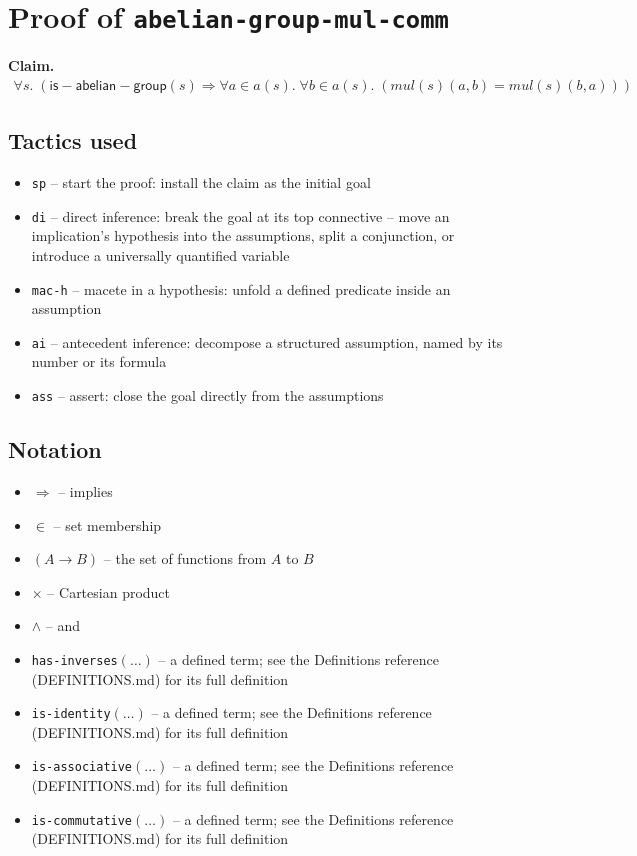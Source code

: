 \documentclass[11pt]{article}
\begin{document}
\section*{Proof of \texttt{abelian-group-mul-comm}}
\textbf{Claim.}
\begin{align*}
  \forall s.\; (\mathsf{is{-}abelian{-}group}(s) \Rightarrow \forall a \in a(s).\; \forall b \in a(s).\; (\mathit{mul}(s)(a, b) = \mathit{mul}(s)(b, a)))
\end{align*}
\bigskip

\subsection*{Tactics used}
\begin{itemize}
\item \texttt{sp} -- start the proof: install the claim as the initial goal
\item \texttt{di} -- direct inference: break the goal at its top connective -- move an implication's hypothesis into the assumptions, split a conjunction, or introduce a universally quantified variable
\item \texttt{mac-h} -- macete in a hypothesis: unfold a defined predicate inside an assumption
\item \texttt{ai} -- antecedent inference: decompose a structured assumption, named by its number or its formula
\item \texttt{ass} -- assert: close the goal directly from the assumptions
\end{itemize}

\subsection*{Notation}
\begin{itemize}
\item $\Rightarrow$ -- implies
\item $\in$ -- set membership
\item $(A \to B)$ -- the set of functions from $A$ to $B$
\item $\times$ -- Cartesian product
\item $\wedge$ -- and
\item \texttt{has-inverses}$(\ldots)$ -- a defined term; see the Definitions reference (DEFINITIONS.md) for its full definition
\item \texttt{is-identity}$(\ldots)$ -- a defined term; see the Definitions reference (DEFINITIONS.md) for its full definition
\item \texttt{is-associative}$(\ldots)$ -- a defined term; see the Definitions reference (DEFINITIONS.md) for its full definition
\item \texttt{is-commutative}$(\ldots)$ -- a defined term; see the Definitions reference (DEFINITIONS.md) for its full definition
\end{itemize}
\end{document}
